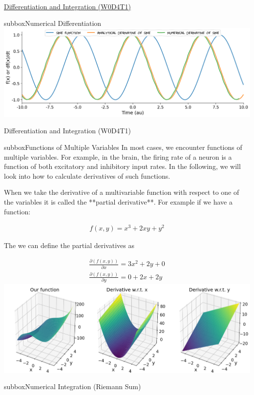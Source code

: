 \begin{textbox}{\href{https://compneuro.neuromatch.io/tutorials/W0D4_Calculus/student/W0D4_Tutorial1.html}{Differentiation and Integration (W0D4T1)}  }
\begin{subbox}{subbox}{Numerical Differentiation}
\centering
\includegraphics[scale=0.15]{Figures/PreCourse/CFigure2.png}
\end{subbox}
\end{textbox}
\begin{textbox}{Differentiation and Integration (W0D4T1) }
\begin{subbox}{subbox}{Functions of Multiple Variables}
\scriptsize
In most cases, we encounter functions of multiple variables. For example, in the brain, the firing rate of a neuron is a function of both excitatory and inhibitory input rates. In the following, we will look into how to calculate derivatives of such functions.

When we take the derivative of a multivariable function with respect to one of the variables it is called the **partial derivative**. For example if we have a function:

\begin{align}
f(x,y) = x^3  +2xy+ y^2
\end{align}

The we can define the partial derivatives as

\begin{align}
\frac{\partial(f(x,y))}{\partial x} = 3x^2  +2y+ 0 \\
\frac{\partial(f(x,y))}{\partial y} = 0+ 2x+2y
\end{align}
\centering
\includegraphics[scale=0.2]{Figures/PreCourse/CFigure3.png}

\end{subbox}
\begin{subbox}{subbox}{Numerical Integration (Riemann Sum)}
\scriptsize


\end{subbox}
\end{textbox}
